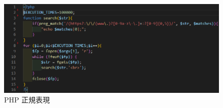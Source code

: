 \begin{figure}[tb]
    \centering
        \includegraphics[width=13.5cm,keepaspectratio]{figure/s-php.PNG}
        \caption{PHP 正規表現}
        \label{fig:s-php}
\end{figure}
